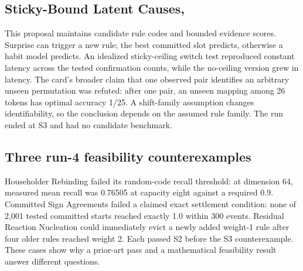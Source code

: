 \subsection{Sticky-Bound Latent Causes, }

This proposal maintains candidate rule codes and bounded evidence scores. Surprise can trigger a new rule; the best committed slot predicts, otherwise a habit model predicts. An idealized sticky-ceiling switch test reproduced constant latency across the tested confirmation counts, while the no-ceiling version grew in latency. The card's broader claim that one observed pair identifies an arbitrary unseen permutation was refuted: after one pair, an unseen mapping among 26 tokens has optimal accuracy 1/25. A shift-family assumption changes identifiability, so the conclusion depends on the assumed rule family. The run ended at S3 and had no candidate benchmark.

\subsection{Three run-4 feasibility counterexamples}

Householder Rebinding failed its random-code recall threshold: at dimension 64, measured mean recall was 0.76505 at capacity eight against a required 0.9. Committed Sign Agreements failed a claimed exact settlement condition: none of 2,001 tested committed starts reached exactly 1.0 within 300 events. Residual Reaction Nucleation could immediately evict a newly added weight-1 rule after four older rules reached weight 2. Each passed S2 before the S3 counterexample. These cases show why a prior-art pass and a mathematical feasibility result answer different questions.


